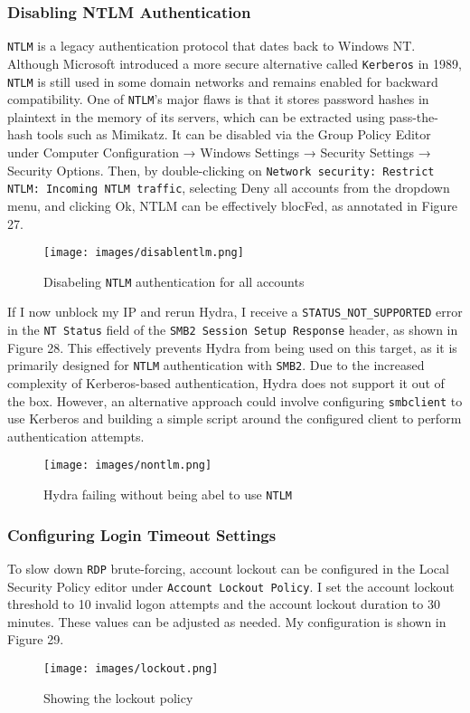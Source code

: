 \documentclass[a4paper]{article}
\newcommand{\abc}{\hfill \break}
\begin{document}
\subsubsection{Disabling NTLM Authentication}
\texttt{NTLM} is a legacy authentication protocol that dates back to Windows NT. Although Microsoft introduced a more secure alternative called \texttt{Kerberos} in 1989, \texttt{NTLM} is still used in some domain networks and remains enabled for backward compatibility. One of \texttt{NTLM}'s major flaws is that it stores password hashes in plaintext in the memory of its servers, which can be extracted using pass-the-hash tools such as Mimikatz. \cite{disable-ntlm, kerberos, mimikatz-ntlm} \abc
It can be disabled via the Group Policy Editor under Computer Configuration → Windows Settings → Security Settings → Security Options. Then, by double-clicking on \texttt{Network security: Restrict NTLM: Incoming NTLM traffic}, selecting Deny all accounts from the dropdown menu, and clicking Ok, NTLM can be effectively blocFed, as annotated in Figure 27.
\begin{figure}[h]
	\texttt{[image: images/disablentlm.png]}
	\centering
	\caption{Disabeling \texttt{NTLM} authentication for all accounts}
\end{figure}\newpage \abc
If I now unblock my IP and rerun Hydra, I receive a \texttt{STATUS\_NOT\_SUPPORTED} error in the \texttt{NT Status} field of the \texttt{SMB2 Session Setup Response} header, as shown in Figure 28. This effectively prevents Hydra from being used on this target, as it is primarily designed for \texttt{NTLM} authentication with \texttt{SMB2}. Due to the increased complexity of Kerberos-based authentication, Hydra does not support it out of the box. However, an alternative approach could involve configuring \texttt{smbclient} to use Kerberos and building a simple script around the configured client to perform authentication attempts.
\begin{figure}[h]
	\texttt{[image: images/nontlm.png]}
	\centering
	\caption{Hydra failing without being abel to use \texttt{NTLM}}
\end{figure}\abc
\subsubsection{Configuring Login Timeout Settings}
To slow down \texttt{RDP} brute-forcing, account lockout can be configured in the Local Security Policy editor under \texttt{Account Lockout Policy}. I set the account lockout threshold to 10 invalid logon attempts and the account lockout duration to 30 minutes. These values can be adjusted as needed. My configuration is shown in Figure 29. \cite{jacobtwc_how_2022}
\begin{figure}[h]
	\texttt{[image: images/lockout.png]}
	\centering
	\caption{Showing the lockout policy}
\end{figure}
\newpage
\end{document}
